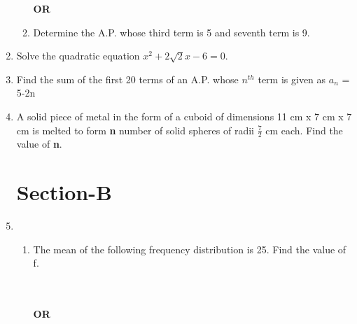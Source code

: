 \begin{enumerate}[\arabic*]
\begin{enumerate}
   \begin{center}
     \textbf{OR}
   \end{center}

   \item Determine the A.P. whose third term is 5 and seventh term is 9.\\

\end{enumerate}

\item Solve the quadratic equation $x^2+2\sqrt{2}x-6 = 0$.\\


\item Find the sum of the first 20 terms of an A.P. whose $n^{th}$ term is given as $a_{n}$ = 5-2n \\


\item A solid piece of metal in the form of a cuboid of dimensions 11 cm x 7 cm x 7 cm is melted to form \textbf{n} number of solid spheres of radii $\frac {7}{2}$ cm each. Find the value of \textbf{n}. \\

\section{\textbf{Section-B}}

\item 
\begin{enumerate}   
   \item The mean of the following frequency distribution is 25. Find the value of f. \\
     \vspace{2mm}\\
     \vspace{3mm}\\ 
                      \begin{center}
                      \textbf{OR}
                      \end{center}
     \vspace{5mm}\\
     

\end{enumerate}
\end{enumerate}
